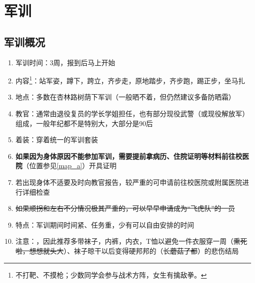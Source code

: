 \chapter[军训]{军训\vspace{-2em}}
\section[军训概况]{军训概况}
\begin{enumerate}
    \item 军训时间：3周，报到后马上开始
    \item 内容\footnote{不打靶、不摸枪；少数同学会参与战术方阵，女生有擒敌拳。}：站军姿，蹲下，跨立，齐步走，原地踏步，齐步跑，踢正步，坐马扎
    \item 地点：多数在杏林路树荫下军训（一般晒不着，但仍然建议多备防晒霜）
    \item 教官：通常由退役复员的学长学姐担任，也有部分现役武警（或现役解放军）组成，一般年纪都不是特别大，大部分是90后
    \item 着装：穿着统一的军训套装\footnotemark
    \item \textbf{如果因为身体原因不能参加军训，需要提前拿病历、住院证明等材料前往校医院}（位置参见\uline{\ref{map_a}}）开具证明\label{exercise_unattend}
    \item 若出现身体不适要及时向教官报告，较严重的可申请前往校医院或附属医院进行详细检查
    \item \sout{如果顺拐和左右不分情况极其严重的，可以早早申请成为“飞虎队”\footnotemark 的一员}
    \item 特点：军训期间时间紧、任务重，少有可以自由安排的时间
    \item 注意：\textbf{}，因此推荐多带袜子，内裤，内衣，T恤以避免一件衣服穿一周（\sout{熏死啦，想想就头大}）、袜子晾干以后变得硬邦邦的（\sout{长蘑菇了都}）的悲伤结局
\end{enumerate}

